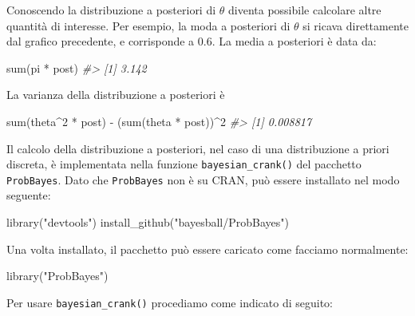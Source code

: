 \documentclass[
  11pt,
]{krantz}
\makeatletter
\newenvironment{Shaded}{\begin{snugshade}}{\end{snugshade}}
\newcommand{\CommentTok}[1]{\textcolor[rgb]{0.37,0.37,0.37}{\textit{#1}}}
\newcommand{\DecValTok}[1]{\textcolor[rgb]{0.06,0.06,0.06}{#1}}
\newcommand{\FunctionTok}[1]{\textcolor[rgb]{0,0,0}{#1}}
\newcommand{\NormalTok}[1]{#1}
\newcommand{\SpecialCharTok}[1]{\textcolor[rgb]{0,0,0}{#1}}
\newcommand{\StringTok}[1]{\textcolor[rgb]{0.5,0.5,0.5}{#1}}
\newenvironment{kframe}{%
\medskip{}
\setlength{\fboxsep}{.8em}
 \def\at@end@of@kframe{}%
 \ifinner\ifhmode%
  \def\at@end@of@kframe{\end{minipage}}%
  \begin{minipage}{\columnwidth}%
 \fi\fi%
 \def\FrameCommand##1{\hskip\@totalleftmargin \hskip-\fboxsep
 \colorbox{shadecolor}{##1}\hskip-\fboxsep
     \hskip-\linewidth \hskip-\@totalleftmargin \hskip\columnwidth}%
 \MakeFramed {\advance\hsize-\width
   \@totalleftmargin\z@ \linewidth\hsize
   \@setminipage}}%
 {\par\unskip\endMakeFramed%
 \at@end@of@kframe}
\renewenvironment{Shaded}{\begin{kframe}}{\end{kframe}}
\theoremstyle{definition}
\theoremstyle{definition}
\theoremstyle{definition}
\theoremstyle{definition}
\theoremstyle{remark}
\makeatother
\begin{document}
Conoscendo la distribuzione a posteriori di \(\theta\) diventa possibile calcolare altre quantità di interesse. Per esempio, la moda a posteriori di \(\theta\) si ricava direttamente dal grafico precedente, e corrisponde a 0.6. La media a posteriori è data da:

\begin{Shaded}
\begin{Highlighting}[]
\FunctionTok{sum}\NormalTok{(pi }\SpecialCharTok{*}\NormalTok{ post)}
\CommentTok{\#\textgreater{} [1] 3.142}
\end{Highlighting}
\end{Shaded}

La varianza della distribuzione a posteriori è

\begin{Shaded}
\begin{Highlighting}[]
\FunctionTok{sum}\NormalTok{(theta}\SpecialCharTok{\^{}}\DecValTok{2} \SpecialCharTok{*}\NormalTok{ post) }\SpecialCharTok{{-}}\NormalTok{ (}\FunctionTok{sum}\NormalTok{(theta }\SpecialCharTok{*}\NormalTok{ post))}\SpecialCharTok{\^{}}\DecValTok{2}
\CommentTok{\#\textgreater{} [1] 0.008817}
\end{Highlighting}
\end{Shaded}

Il calcolo della distribuzione a posteriori, nel caso di una distribuzione a priori discreta, è implementata nella funzione \texttt{bayesian\_crank()} del pacchetto \texttt{ProbBayes}. Dato che \texttt{ProbBayes} non è su CRAN, può essere installato nel modo seguente:

\begin{Shaded}
\begin{Highlighting}[]
\FunctionTok{library}\NormalTok{(}\StringTok{"devtools"}\NormalTok{)}
\FunctionTok{install\_github}\NormalTok{(}\StringTok{"bayesball/ProbBayes"}\NormalTok{)}
\end{Highlighting}
\end{Shaded}

Una volta installato, il pacchetto può essere caricato come facciamo normalmente:

\begin{Shaded}
\begin{Highlighting}[]
\FunctionTok{library}\NormalTok{(}\StringTok{"ProbBayes"}\NormalTok{)}
\end{Highlighting}
\end{Shaded}

Per usare \texttt{bayesian\_crank()} procediamo come indicato di seguito:
\end{document}
